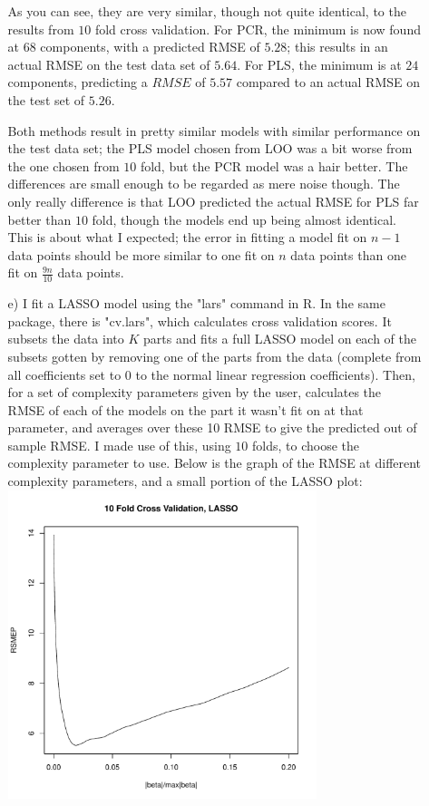 \documentclass[11pt]{article}
\theoremstyle{definition}
\begin{document}
\begin{itemize}
\begin{itemize}
                As you can see, they are very similar, though not quite identical, to the results from $10$ fold cross validation. For PCR, the minimum is now found at $68$ components, with a predicted RMSE of $5.28$; this results in an actual RMSE on the test data set of $5.64$. For PLS, the minimum is at $24$ components, predicting a $RMSE$ of $5.57$ compared to an actual RMSE on the test set of $5.26$. \par
                Both methods result in pretty similar models with similar performance on the test data set; the PLS model chosen from LOO was a bit worse from the one chosen from $10$ fold, but the PCR model was a hair better. The differences are small enough to be regarded as mere noise though. The only really difference is that LOO predicted the actual RMSE for PLS far better than $10$ fold, though the models end up being almost identical. This is about what I expected; the error in fitting a model fit on $n-1$ data points should be more similar to one fit on $n$ data points than one fit on $\frac{9n}{10}$ data points.
            \item[e)]
                I fit a LASSO model using the "lars" command in R. In the same package, there is "cv.lars", which calculates cross validation scores. It subsets the data into $K$ parts and fits a full LASSO model on each of the subsets gotten by removing one of the parts from the data (complete from all coefficients set to 0 to the normal linear regression coefficients). Then, for a set of complexity parameters given by the user, calculates the RMSE of each of the models on the part it wasn't fit on at that parameter, and averages over these 10 RMSE to give the predicted out of sample RMSE. I made use of this, using $10$ folds, to choose the complexity parameter to use.
 Below is the graph of the RMSE at different complexity parameters, and a small portion of the LASSO plot: \\   
                \includegraphics[width=9cm]{final/3e_cv_plot}

\end{itemize}
\end{itemize}
\end{document}
